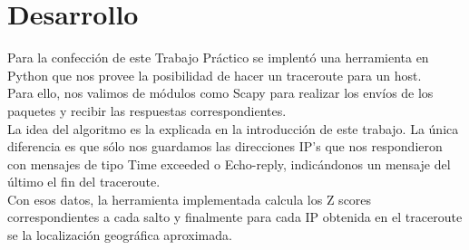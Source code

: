 \section{Desarrollo}

\indent \indent Para la confección de este Trabajo Práctico se implentó una herramienta en Python que nos provee la posibilidad de hacer un traceroute para un host. \\
\indent Para ello, nos valimos de módulos como Scapy para realizar los envíos de los paquetes y recibir las respuestas correspondientes.\\
\indent La idea del algoritmo es la explicada en la introducción de este trabajo. La única diferencia es que sólo nos guardamos las direcciones IP's que nos respondieron con mensajes de tipo Time exceeded o Echo-reply, indicándonos un mensaje del último el fin del traceroute.\\

\indent Con esos datos, la herramienta implementada calcula los Z scores correspondientes a cada salto y finalmente para cada IP obtenida en el traceroute se la localización geográfica aproximada.\\